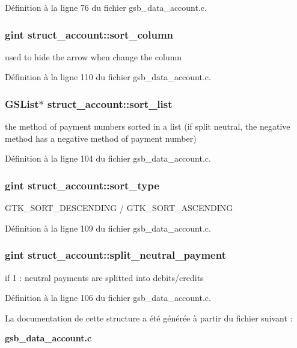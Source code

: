 Définition à la ligne 76 du fichier gsb\_\-data\_\-account.c.

\subsubsection[{sort\_\-column}]{\setlength{\rightskip}{0pt plus 5cm}gint {\bf struct\_\-account::sort\_\-column}}\label{structstruct__account_a276fddb19258f69351c675b080865be1}
used to hide the arrow when change the column 

Définition à la ligne 110 du fichier gsb\_\-data\_\-account.c.

\subsubsection[{sort\_\-list}]{\setlength{\rightskip}{0pt plus 5cm}GSList$\ast$ {\bf struct\_\-account::sort\_\-list}}\label{structstruct__account_a16ee9f3a4c22b1f9f91e0d05f0c7bebc}
the method of payment numbers sorted in a list (if split neutral, the negative method has a negative method of payment number) 

Définition à la ligne 104 du fichier gsb\_\-data\_\-account.c.

\subsubsection[{sort\_\-type}]{\setlength{\rightskip}{0pt plus 5cm}gint {\bf struct\_\-account::sort\_\-type}}\label{structstruct__account_adc8299d022a5a7469feace6aa04d22ab}
GTK\_\-SORT\_\-DESCENDING / GTK\_\-SORT\_\-ASCENDING 

Définition à la ligne 109 du fichier gsb\_\-data\_\-account.c.

\subsubsection[{split\_\-neutral\_\-payment}]{\setlength{\rightskip}{0pt plus 5cm}gint {\bf struct\_\-account::split\_\-neutral\_\-payment}}\label{structstruct__account_a47d4135aff202c7b8987797e553ff8c8}
if 1 : neutral payments are splitted into debits/credits 

Définition à la ligne 106 du fichier gsb\_\-data\_\-account.c.



La documentation de cette structure a été générée à partir du fichier suivant :\begin{DoxyCompactItemize}
\item 
{\bf gsb\_\-data\_\-account.c}\end{DoxyCompactItemize}
